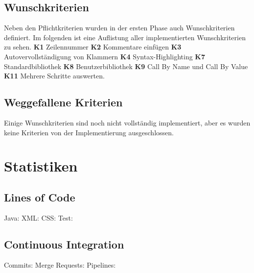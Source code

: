 \documentclass[parskip=full,11pt,twoside]{scrartcl}
\begin{document}
\subsection{Wunschkriterien}
Neben den Pflichtkriterien wurden in der ersten Phase auch Wunschkriterien definiert.
Im folgenden ist eine Auflistung aller implementierten Wunschkriterien zu sehen.
\newline
\newline
\textbf{K1} Zeilennummer
\newline
\textbf{K2} Kommentare einfügen
\newline
\textbf{K3} Autovervollständigung von Klammern
\newline
\textbf{K4} Syntax-Highlighting
\newline
\textbf{K7} Standardbibliothek
\newline
\textbf{K8} Benutzerbibliothek
\newline
\textbf{K9} Call By Name und Call By Value
\newline
\textbf{K11} Mehrere Schritte auswerten.
\newline

\subsection{Weggefallene Kriterien}
Einige Wunschkriterien sind noch nicht vollständig implementiert, aber es wurden keine Kriterien von der Implementierung ausgeschlossen.
\newpage


\section{Statistiken}

\subsection{Lines of Code}
Java: \space\space\space{}\newline
XML: \space\space\space{}\newline
CSS:\space\space\space\space\space{} \newline
Test: \space\space\space\space{}
\subsection{Continuous Integration}
Commits: \space\space\space\space\space\space\space\space\space\space\space\space\space\space\space\space{}\newline
Merge Requests:\space\space\space\space{}\newline
Pipelines:\space\space\space\space\space\space\space\space\space\space\space\space\space\space\space\space\space{}
\end{document}
